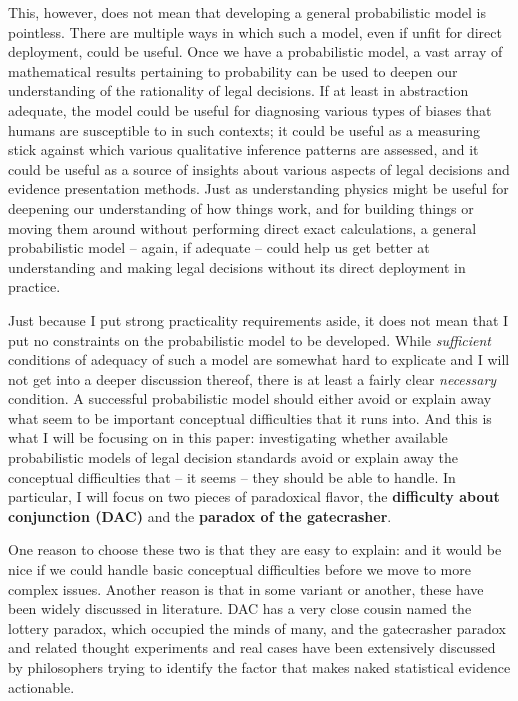 \documentclass[10pt,dvipsnames,enabledeprecatedfontcommands]{scrartcl}
\begin{document}
This, however, does not mean that developing a general probabilistic
model is pointless. There are multiple ways in which such a model, even
if unfit for direct deployment, could be useful. Once we have a
probabilistic model, a vast array of mathematical results pertaining to
probability can be used to deepen our understanding of the rationality
of legal decisions. If at least in abstraction adequate, the model could
be useful for diagnosing various types of biases that humans are
susceptible to in such contexts; it could be useful as a measuring stick
against which various qualitative inference patterns are assessed, and
it could be useful as a source of insights about various aspects of
legal decisions and evidence presentation methods. Just as understanding
physics might be useful for deepening our understanding of how things
work, and for building things or moving them around without performing
direct exact calculations, a general probabilistic model -- again, if
adequate -- could help us get better at understanding and making legal
decisions without its direct deployment in practice.

Just because I put strong practicality requirements aside, it does not
mean that I put no constraints on the probabilistic model to be
developed. While \emph{sufficient} conditions of adequacy of such a
model are somewhat hard to explicate and I will not get into a deeper
discussion thereof, there is at least a fairly clear \emph{necessary}
condition. A successful probabilistic model should either avoid or
explain away what seem to be important conceptual difficulties that it
runs into. And this is what I will be focusing on in this paper:
investigating whether available probabilistic models of legal decision
standards avoid or explain away the conceptual difficulties that -- it
seems -- they should be able to handle. In particular, I will focus on
two pieces of paradoxical flavor, the
\textbf{difficulty about conjunction (DAC)} and the
\textbf{paradox of the gatecrasher}.

One reason to choose these two is that they are easy to explain: and it
would be nice if we could handle basic conceptual difficulties before we
move to more complex issues. Another reason is that in some variant or
another, these have been widely discussed in literature. DAC has a very
close cousin named the lottery paradox, which occupied the minds of
many, and the gatecrasher paradox and related thought experiments and
real cases have been extensively discussed by philosophers trying to
identify the factor that makes naked statistical evidence actionable.
\end{document}
